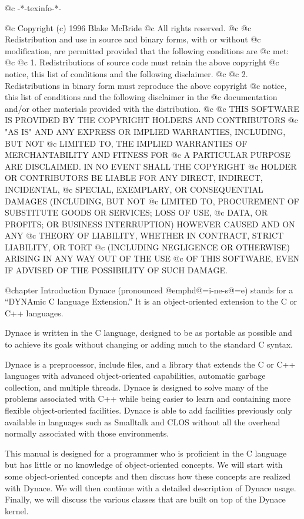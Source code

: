 @c -*-texinfo-*-

@c  Copyright (c) 1996 Blake McBride
@c  All rights reserved.
@c
@c  Redistribution and use in source and binary forms, with or without
@c  modification, are permitted provided that the following conditions are
@c  met:
@c
@c  1. Redistributions of source code must retain the above copyright
@c  notice, this list of conditions and the following disclaimer.
@c
@c  2. Redistributions in binary form must reproduce the above copyright
@c  notice, this list of conditions and the following disclaimer in the
@c  documentation and/or other materials provided with the distribution.
@c
@c  THIS SOFTWARE IS PROVIDED BY THE COPYRIGHT HOLDERS AND CONTRIBUTORS
@c  "AS IS" AND ANY EXPRESS OR IMPLIED WARRANTIES, INCLUDING, BUT NOT
@c  LIMITED TO, THE IMPLIED WARRANTIES OF MERCHANTABILITY AND FITNESS FOR
@c  A PARTICULAR PURPOSE ARE DISCLAIMED. IN NO EVENT SHALL THE COPYRIGHT
@c  HOLDER OR CONTRIBUTORS BE LIABLE FOR ANY DIRECT, INDIRECT, INCIDENTAL,
@c  SPECIAL, EXEMPLARY, OR CONSEQUENTIAL DAMAGES (INCLUDING, BUT NOT
@c  LIMITED TO, PROCUREMENT OF SUBSTITUTE GOODS OR SERVICES; LOSS OF USE,
@c  DATA, OR PROFITS; OR BUSINESS INTERRUPTION) HOWEVER CAUSED AND ON ANY
@c  THEORY OF LIABILITY, WHETHER IN CONTRACT, STRICT LIABILITY, OR TORT
@c  (INCLUDING NEGLIGENCE OR OTHERWISE) ARISING IN ANY WAY OUT OF THE USE
@c  OF THIS SOFTWARE, EVEN IF ADVISED OF THE POSSIBILITY OF SUCH DAMAGE.


@chapter Introduction
Dynace (pronounced @emph{d@=i-ne-s@=e}) stands for a ``DYNAmic C
language Extension.''  It is an object-oriented extension to the C or
C++ languages.

Dynace is written in the C language, designed to be as portable as
possible and to achieve its goals without changing or adding much to the
standard C syntax.

Dynace is a preprocessor, include files, and a library that extends the
C or C++ languages with advanced object-oriented capabilities, automatic
garbage collection, and multiple threads.  Dynace is designed to solve
many of the problems associated with C++ while being easier to learn and
containing more flexible object-oriented facilities.  Dynace is able to
add facilities previously only available in languages such as Smalltalk
and CLOS without all the overhead normally associated with those
environments.

This manual is designed for a programmer who is proficient in the C language
but has little or no knowledge of object-oriented concepts.  We will start
with some object-oriented concepts and then discuss how these concepts
are realized with Dynace.  We will then continue with a detailed description of
Dynace usage.  Finally, we will discuss the various classes that are built
on top of the Dynace kernel.


